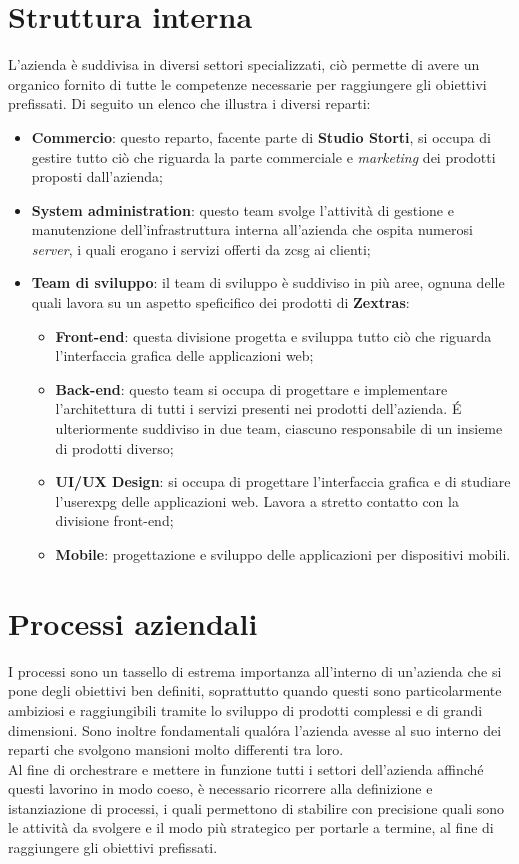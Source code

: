 \section{Struttura interna}
    L'azienda è suddivisa in diversi settori specializzati, ciò permette di avere un organico fornito di tutte le competenze necessarie per raggiungere gli obiettivi prefissati. Di seguito un elenco che illustra i diversi reparti:
    \begin{itemize}
        \item \textbf{Commercio}: questo reparto, facente parte di \textbf{Studio Storti}, si occupa di gestire tutto ciò che riguarda la parte commerciale e \textit{marketing} dei prodotti proposti dall'azienda;
        \item \textbf{System administration}: questo team svolge l'attività di gestione e manutenzione dell'infrastruttura interna all'azienda che ospita numerosi \textit{server}, i quali erogano i servizi offerti da \gls{zcsg} ai clienti;
        \item \textbf{Team di sviluppo}:
            il team di sviluppo è suddiviso in più aree, ognuna delle quali lavora su un aspetto speficifico dei prodotti di \textbf{Zextras}:
            \begin{itemize}
                \item \textbf{Front-end}: questa divisione progetta e sviluppa tutto ciò che riguarda l'interfaccia grafica delle applicazioni web;
                \item \textbf{Back-end}: questo team si occupa di progettare e implementare l'architettura di tutti i servizi presenti nei prodotti dell'azienda. \'E ulteriormente suddiviso in due team, ciascuno responsabile di un insieme di prodotti diverso;
                \item \textbf{UI/UX Design}: si occupa di progettare l'interfaccia grafica e di studiare l'\gls{userexpg} delle applicazioni web. Lavora a stretto contatto con la divisione front-end;
                \item \textbf{Mobile}: progettazione e sviluppo delle applicazioni per dispositivi mobili.
            \end{itemize}
    \end{itemize}

\section{Processi aziendali}
    I processi sono un tassello di estrema importanza all'interno di un'azienda che si pone degli obiettivi ben definiti, soprattutto quando questi sono particolarmente ambiziosi e raggiungibili tramite lo sviluppo di prodotti complessi e di grandi dimensioni. Sono inoltre fondamentali qual\'{o}ra l'azienda avesse al suo interno dei reparti che svolgono mansioni molto differenti tra loro. \\
    Al fine di orchestrare e mettere in funzione tutti i settori dell'azienda affinché questi lavorino in modo coeso, è necessario ricorrere alla definizione e istanziazione di processi, i quali permettono di stabilire con precisione quali sono le attività da svolgere e il modo più strategico per portarle a termine, al fine di raggiungere gli obiettivi prefissati.
